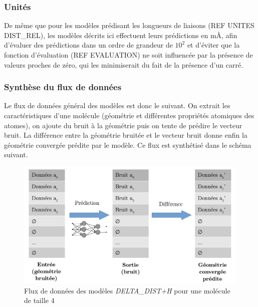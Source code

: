 \subsubsection{Unités}
\par De même que pour les modèles prédisant les longueurs de liaisons (REF UNITES DIST\_REL), les modèles décrits ici effectuent leurs prédictions en mÅ, afin d'évaluer des prédictions dans un ordre de grandeur de $10^2$ et d'éviter que la fonction d'évaluation (REF EVALUATION) ne soit influencée par la présence de valeurs proches de zéro, qui les minimiserait du fait de la présence d'un carré.

\subsubsection{Synthèse du flux de données}
\par Le flux de données général des modèles est donc le suivant. On extrait les caractéristiques d'une molécule (géométrie et différentes propriétés atomiques des atomes), on ajoute du bruit à la géométrie puis on tente de prédire le vecteur bruit. La différence entre la géométrie bruitée et le vecteur bruit donne enfin la géométrie convergée prédite par le modèle. Ce flux est synthétisé dans le schéma suivant.

\vspace{0.5cm}

\begin{figure}[!h]
	\centering
	
	\includegraphics[scale=0.35]{images/flux_donnees.png}
	
	\caption{Flux de données des modèles \emph{DELTA\_DIST+H} pour une molécule de taille 4}
\end{figure}
